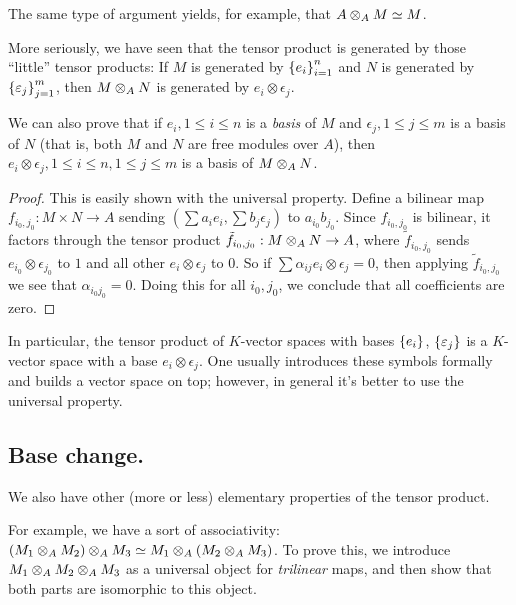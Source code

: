The same type of argument yields, for example, that $A \otimes_{A} M \simeq M$.

More seriously, we have seen that the tensor product is generated by those ``little'' tensor products: If $M$ is generated by $\left\{e_i\right\}_{i = 1}^{n}$ and $N$ is generated by $\left\{\varepsilon_j\right\}_{j = 1}^{m}$, then $M \otimes_{A} N$ is generated by $e_i \otimes \epsilon_j$.

\begin{prop}
We can also prove that if $e_i, 1 \leq i \leq n$ is a \emph{basis} of $M$ and $\epsilon_j, 1 \leq j \leq m$ is a basis of $N$ (that is, both $M$ and $N$ are free modules over $A$), then $e_i \otimes \epsilon_j, 1 \leq i \leq n, 1 \leq j \leq m$ is a basis of $M \otimes_{A} N$. 
\end{prop}
\begin{proof}
This is easily shown with the universal property.
Define a bilinear map $f_{i_0, j_0}: M \times N \to A$ sending $(\sum a_i e_i, \sum b_j \epsilon_j)$ to $a_{i_0}b_{j_0}$.
Since $f_{i_0, j_0}$ is bilinear, it factors through the tensor product $\tilde{f}_{i_0, j_0}: M \otimes_{A} N \to A$, where $\tilde{f}_{i_0, j_0}$ sends $e_{i_0} \otimes \epsilon_{j_0}$ to $1$ and all other $e_i \otimes \epsilon_j$ to $0$. So if $\sum \alpha_{ij} e_i \otimes \epsilon_j = 0$, then applying $\tilde{f}_{i_0, j_0}$ we see that $\alpha_{i_0 j_0} = 0$. Doing this for all $i_0, j_0$, we conclude that all coefficients are zero.
\end{proof}

\begin{ex}
In particular, the tensor product of $K$-vector spaces with bases $\left\{e_i\right\}$, $\left\{\varepsilon_j\right\}$ is a $K$-vector space with a base $e_i \otimes \epsilon_j$. 
One usually introduces these symbols formally and builds a vector space on top; however, in general it's better to use the universal property.
\end{ex}

\subsection{Base change.}
We also have other (more or less) elementary properties of the tensor product.

\begin{ex}
For example, we have a sort of associativity: $(M_1 \otimes_{A} M_2) \otimes_{A} M_3 \simeq M_1 \otimes_{A} (M_2 \otimes_{A} M_3)$. 
To prove this, we introduce $M_1 \otimes_{A} M_2 \otimes_{A} M_3$ as a universal object for \emph{trilinear} maps, and then show that both parts are isomorphic to this object.
\end{ex}


